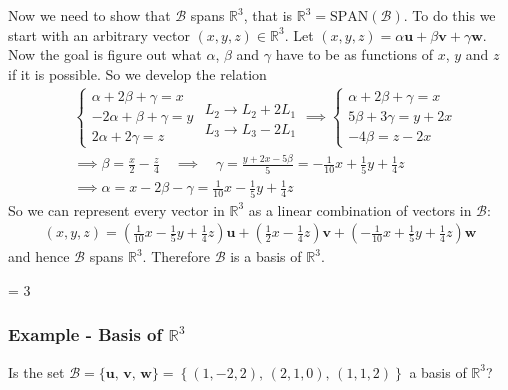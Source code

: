 \documentclass[usenames,dvipsnames,aspectratio=169,10pt]{beamer}
\def \EXAMPLEVERSION {3} %
\numberwithin{equation}{section}
\begin{document}
\begin{frame}
Now we need to show that $\mathcal{B}$ spans $\mathbb{R}^3$, that is $\mathbb{R}^3 = \text{SPAN}(\mathcal{B})$. To do this we start with an arbitrary vector $(x,y,z)\in\mathbb{R}^3$. Let $(x,y,z) = \alpha \mathbf{u} +  \beta \mathbf{v} + \gamma \mathbf{w}$. Now the goal is figure out what $\alpha$, $\beta$ and $\gamma$ have to be as functions of $x$, $y$ and $z$ if it is possible. So we develop the relation
\begin{align*}
&\begin{cases}
\alpha + 2\beta + \gamma = x \\
-2\alpha + \beta + \gamma = y \\
2\alpha + 2\gamma = z 
\end{cases}
\begin{matrix}
\, \\
L_2 \to L_2 + 2L_1 \\
L_3 \to L_3 - 2L_1 
\end{matrix}
%
%
\implies  \begin{cases}
\alpha + 2\beta + \gamma = x \\
5\beta + 3\gamma = y+2x \\
-4\beta = z-2x
\end{cases} \\
%
%
& \implies \beta = \frac{x}{2} - \frac{z}{4} \quad\implies\quad \gamma = \frac{y+2x-5\beta}{5} = -\frac{1}{10}x + \frac{1}{5}y+\frac{1}{4}z \\
& \implies \alpha = x - 2\beta - \gamma = \frac{1}{10}x - \frac{1}{5}y+\frac{1}{4}z
\end{align*}
So we can represent every vector in $\mathbb{R}^3$ as a linear combination of vectors in $\mathcal{B}$:
\begin{align*}
(x,y,z) = \left(\frac{1}{10}x - \frac{1}{5}y+\frac{1}{4}z\right) \mathbf{u} +  \left(\frac{1}{2}x - \frac{1}{4}z\right) \mathbf{v} + \left(-\frac{1}{10}x + \frac{1}{5}y+\frac{1}{4}z\right)\mathbf{w}
\end{align*}
and hence $\mathcal{B}$ spans $\mathbb{R}^3$. Therefore $\mathcal{B}$ is a basis of $\mathbb{R}^3$.
\end{frame}
\fi 



\ifnum \EXAMPLEVERSION = 3
\begin{frame}
\frametitle{Example - Basis of $\mathbb{R}^3$}

\noindent Is the set $\mathcal{B}=\{\mathbf{u}, \, \mathbf{v}, \, \mathbf{w} \} = \left\{(1,-2,2), \, (2,1,0), \, (1,1,2) \right\}$ a basis of $\mathbb{R}^3$?
\vspace{6cm}
\end{frame}
\fi 
\end{document}
